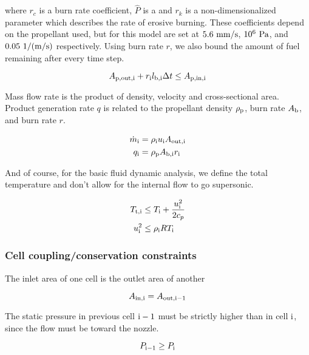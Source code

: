 where $r_c$ is a burn rate coefficient, $\hat{P}$ is a and $r_k$ is a non-dimensionalized parameter
which describes the rate of erosive burning. These coefficients
depend on the propellant used, but for this model are set at
$5.6~\rm{mm/s}$, $10^{6}~\rm{Pa}$, and $0.05~\rm{1/(m/s)}$ respectively. Using burn rate $r$,
we also bound the amount of fuel remaining after every time step.

\begin{equation}
    A_{\rm{p, out, i}} + r_{\rm{i}} l_{\rm{b, i}} \Delta t \leq A_{\rm{p, in, i}}
\end{equation}

Mass flow rate is the product of density, velocity and cross-sectional area.
Product generation rate $q$ is related to the propellant density $\rho_{\rm{p}}$,
burn rate $A_{\rm{b}}$, and burn rate $r$.

\begin{align}
    \dot{m}_{\rm{i}} &= \rho_{\rm{i}} u_{\rm{i}} A_{\rm{out}, \rm{i}} \\
    q_{\rm{i}} &= \rho_{\rm{p}} A_{\rm{b, i}} r_{\rm{i}} \\
\end{align}

And of course, for the basic fluid dynamic analysis, we define the total temperature
and don't allow for the internal flow to go supersonic.

\begin{align}
    T_{\rm{t,i}} &\leq T_{\rm{i}} + \frac{u_{\rm{i}}^2}{2c_{p}} \\
    u_{\rm{i}}^2 &\leq \rho_{\rm{i}} R T_{\rm{i}}
\end{align}

\subsubsection{Cell coupling/conservation constraints}

The inlet area of one cell is the outlet area of another

\begin{equation}
    A_{\rm{in}, \rm{i}} = A_{\rm{out}, \rm{i}-1}
\end{equation}

The static pressure in previous cell $\rm{i}-1$ must be strictly higher
than in cell $\rm{i}$, since the flow must be toward the nozzle.

\begin{equation}
    P_{\rm{i}-1} \geq P_{\rm{i}}
\end{equation}

